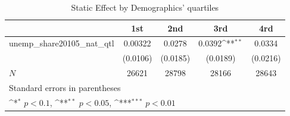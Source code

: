\begin{table}[htbp]\centering
\def\sym#1{\ifmmode^{#1}\else\(^{#1}\)\fi}
\caption{Static Effect by Demographics' quartiles}
\begin{tabular}{l*{4}{c}}
\hline\hline
            &\multicolumn{1}{c}{1st}&\multicolumn{1}{c}{2nd}&\multicolumn{1}{c}{3rd}&\multicolumn{1}{c}{4rd}\\
\hline
unemp\_share20105\_nat\_qtl&     0.00322         &      0.0278         &      0.0392\sym{**} &      0.0334         \\
            &    (0.0106)         &    (0.0185)         &    (0.0189)         &    (0.0216)         \\
\hline
\(N\)       &       26621         &       28798         &       28166         &       28643         \\
\hline\hline
\multicolumn{5}{l}{\footnotesize Standard errors in parentheses}\\
\multicolumn{5}{l}{\footnotesize \sym{*} \(p<0.1\), \sym{**} \(p<0.05\), \sym{***} \(p<0.01\)}\\
\end{tabular}
\end{table}
